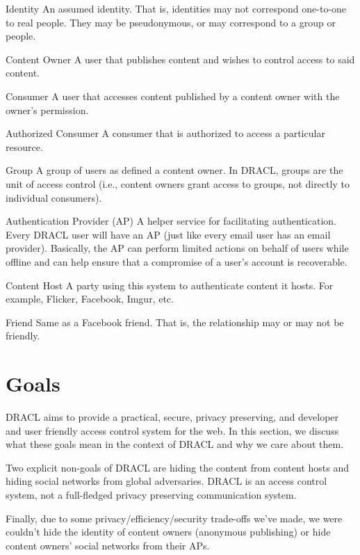 \documentclass[pdftex,12pt,a4papaer]{report}
\begin{document}
\begin{compactdesc}
    \item[Identity] An assumed identity. That is, identities may not correspond
      one-to-one to real people. They may be pseudonymous, or may correspond to
      a group or people.
    \item[Content Owner] A user that publishes content and wishes to control
      access to said content.
    \item[Consumer] A user that accesses content published by a content owner
      with the owner's permission.
    \item[Authorized Consumer] A consumer that is authorized to access a
      particular resource.
    \item[Group] A group of users as defined a content owner. In DRACL, groups
      are the unit of access control (i.e., content owners grant access to
      groups, not directly to individual consumers).
    \item[Authentication Provider (AP)] A helper service for facilitating
      authentication. Every DRACL user will have an AP (just like every email
      user has an email provider). Basically, the AP can perform limited
      actions on behalf of users while offline and can help ensure that a
      compromise of a user's account is recoverable.
    \item[Content Host] A party using this system to authenticate content it
      hosts. For example, Flicker, Facebook, Imgur, etc.
    \item[Friend] Same as a Facebook friend. That is, the relationship may or
      may not be friendly.
\end{compactdesc}

\section{Goals}

DRACL aims to provide a practical, secure, privacy preserving, and developer and
user friendly access control system for the web. In this section, we discuss
what these goals mean in the context of DRACL and why we care about them.

Two explicit non-goals of DRACL are hiding the content from content hosts and
hiding social networks from global adversaries. DRACL is an access control
system, not a full-fledged privacy preserving communication system.

Finally, due to some privacy/efficiency/security trade-offs we've made, we were
couldn't hide the identity of content owners (anonymous publishing) or hide
content owners' social networks from their APs.
\end{document}
